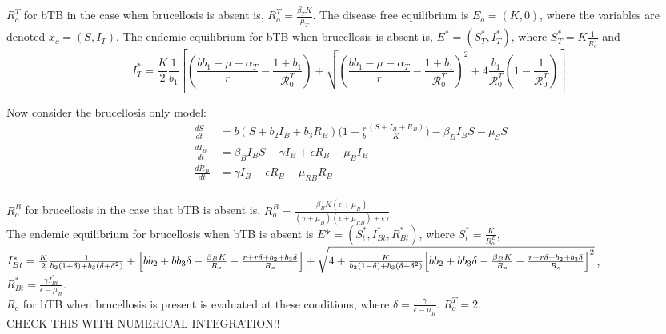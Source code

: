 \documentclass[letterpaper,12pt]{article}
\begin{document}
$R_{o}^{T}$ for bTB in the case when brucellosis is absent is, $R_{o}^{T} = \frac{\beta_T K}{\mu_T}$.  
The disease free equilibrium is $E_o = (K, 0)$, where the variables are denoted $x_o = (S, I_T)$.
The endemic equilibrium for bTB when brucellosis is absent is,  $E^{*} = (S_{T}^{*}, I_{T}^{*})$, where $S_{T}^{*} = K \frac{1}{R_{o}^{T}}$ and 
\begin{equation*}
I_{T}^*=\frac{K}{2}\frac{1}{b_1}\left[ 
\left(\frac{bb_1 - \mu - \alpha_T}{r}  - \frac{1+b_1}{\mathcal{R}_0^{T}}\right) + \sqrt{\left(\frac{bb_1 - \mu - \alpha_T}{r}  - \frac{1+b_1}{\mathcal{R}_0^{T}}\right)^2 + 4 \frac{b_1 }{\mathcal{R}_0^{T}}\left(1-\frac{1}{\mathcal{R}_0^{T}}\right)}\right].
\end{equation*}

Now consider the brucellosis only model: 
\begin{align*}
\frac{dS}{dt} &= b (S+ b_2 I_{B} + b_3 R_{B}) \big(1 - \frac{r}{b} \frac{(S+ I_{B} + R_{B})}{K}\big)- \beta_B I_B S - \mu_{S} S  \\		      					%
\frac{dI_{B}}{dt}&=  \beta_B I_B S - \gamma I_{B} + \epsilon R_{B}  - \mu_{B} I_{B} \\ 		 					%
\frac{dR_{B}}{dt}&=  \gamma I_{B} - \epsilon R_{B} - \mu_{RB} R_{B} \\  										%
\end{align*}

$R_{o} ^B$ for brucellosis in the case that bTB is absent is, $R_{o}^{B} = \frac{\beta_B K (\epsilon + \mu_R)}{(\gamma + \mu_B) (\epsilon + \mu_{RB}) + \epsilon \gamma}$ \\
The endemic equilibrium for brucellosis when bTB is absent is $E* = (S_{t}^*, I_{Bt}^*, R_{Bt}^*)$, where 
$S_{t}^* = \frac{K}{R_{o} ^B}$, \\
$I_{Bt}^* = \frac{K}{2} \frac{1}{b_2(1+\delta)+ b_3 (\delta + \delta^2)} + \Big[b b_2 + b b_3 \delta - \frac{ \beta_B K}{R_o} - \frac{r + r \delta + b_2 + b_3 \delta}{R_o}\Big] +\\
 \sqrt{4 + \frac{K}{b_2 (1-\delta) + b_3 (\delta + \delta^2)} \Big[b b_2 + b b_3 \delta - \frac{ \beta_B K}{R_o} - \frac{r + r \delta + b_2 + b_3 \delta}{R_o}\Big] ^2}$,\\
$R_{Bt}^* =  \frac{\gamma I_{Bt}^*}{\epsilon - \mu_R}$. \\
$R_o$ for bTB when brucellosis is present is evaluated at these conditions, where $\delta = \frac{\gamma}{\epsilon - \mu_R}.$
$R_{o}^{T} = 2$. \\
CHECK THIS WITH NUMERICAL INTEGRATION!!
\end{document}
